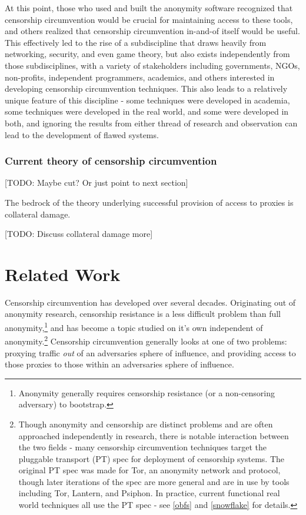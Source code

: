 \documentclass[12pt]{report}
\begin{document}
At this point, those who used and built the anonymity software recognized that censorship circumvention would be crucial for maintaining access to these tools, and others realized that censorship circumvention in-and-of itself would be useful. This effectively led to the rise of a subdiscipline that draws heavily from networking, security, and even game theory, but also exists independently from those subdisciplines, with a variety of stakeholders including governments, NGOs, non-profits, independent programmers, academics, and others interested in developing censorship circumvention techniques. This also leads to a relatively unique feature of this discipline - some techniques were developed in academia, some techniques were developed in the real world, and some were developed in both, and ignoring the results from either thread of research and observation can lead to the development of flawed systems.

\subsection{Current theory of censorship circumvention}

[TODO: Maybe cut? Or just point to next section]

The bedrock of the theory underlying successful provision of access to proxies is collateral damage.

[TODO: Discuss collateral damage more]

\chapter{Related Work}

Censorship circumvention has developed over several decades. Originating out of anonymity research, censorship resistance is a less difficult problem than full anonymity,\footnote{Anonymity generally requires censorship resistance (or a non-censoring adversary) to bootstrap.} and has become a topic studied on it's own independent of anonymity.\footnote{Though anonymity and censorship are distinct problems and are often approached independently in research, there is notable interaction between the two fields - many censorship circumvention techniques target the pluggable transport (PT) spec for deployment of censorship systems. The original PT spec was made for Tor, an anonymity network and protocol,\cite{tor} though later iterations of the spec are more general and are in use by tools including Tor, Lantern, and Psiphon.\label{pt}\cite{pt} In practice, current functional real world techniques all use the PT spec - see \ref{obfs} and \ref{snowflake} for details.} Censorship circumvention generally looks at one of two problems: proxying traffic \emph{out} of an adversaries sphere of influence, and providing access to those proxies to those within an adversaries sphere of influence.
\end{document}
